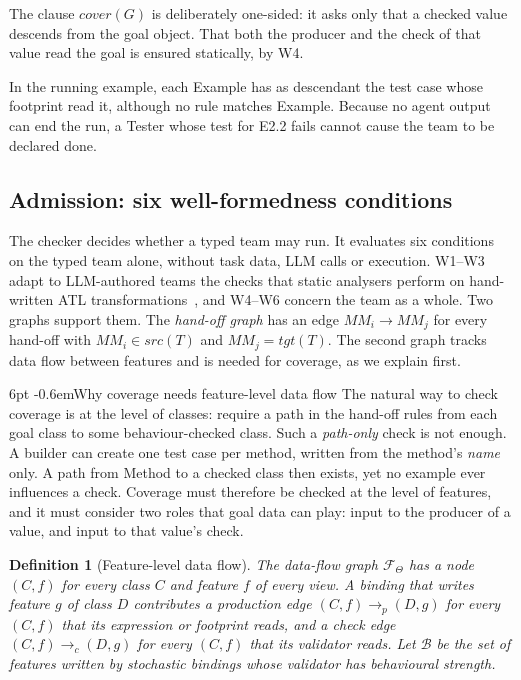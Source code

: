 \documentclass[pdflatex,sn-mathphys-num]{sn-jnl}
\makeatletter
\theoremstyle{thmstyleone}%
\theoremstyle{thmstyletwo}%
\theoremstyle{thmstylethree}%
\newtheorem{definition}{Definition}%
\newcommand{\Team}{\Theta}
\newcommand{\W}[1]{\textsf{W#1}}
\newcommand{\MM}{\mathit{MM}}
\newcommand{\cls}[1]{\textsf{#1}}
\renewcommand\paragraph{\@startsection{paragraph}{4}{\z@}%
  {6pt \@plus 2pt \@minus 1pt}{-0.6em}{\normalfont\normalsize\bfseries}}
\makeatother
\begin{document}
The clause $\mathit{cover}(G)$ is deliberately one-sided: it asks only that a
checked value descends from the goal object. That both the producer and the
check of that value read the goal is ensured statically, by \W{4}.

In the running example, each \cls{Example} has as descendant the test case
whose footprint read it, although no rule matches \cls{Example}. Because no
agent output can end the run, a Tester whose test for E2.2 fails cannot cause
the team to be declared done.

\subsection{Admission: six well-formedness conditions}\label{sec:app-check}

The checker decides whether a typed team may run. It evaluates six conditions
on the typed team alone, without task data, LLM calls or execution.
\W{1}--\W{3} adapt to LLM-authored teams the checks that static analysers
perform on hand-written ATL transformations~\cite{cuadrado2017static}, and
\W{4}--\W{6} concern the team as a whole. Two graphs support them. The
\emph{hand-off graph} has an edge $\MM_i\to\MM_j$ for every hand-off with
$\MM_i\in\mathit{src}(T)$ and $\MM_j=\mathit{tgt}(T)$. The second graph tracks
data flow between features and is needed for coverage, as we explain first.

\paragraph{Why coverage needs feature-level data flow} The natural way to check
coverage is at the level of classes: require a path in the hand-off rules from
each goal class to some behaviour-checked class. Such a \emph{path-only} check
is not enough. A builder can create one test case per method, written from the
method's \emph{name} only. A path from \cls{Method} to a checked class then
exists, yet no example ever influences a check. Coverage must therefore be
checked at the level of features, and it must consider two roles that goal
data can play: input to the producer of a value, and input to that value's
check.

\begin{definition}[Feature-level data flow]\label{def:dataflow}
The data-flow graph $\mathcal{F}_\Team$ has a node $(C,f)$ for every class $C$
and feature $f$ of every view. A binding that writes feature $g$ of class $D$
contributes a \emph{production} edge $(C,f)\to_p(D,g)$ for every $(C,f)$ that
its expression or footprint reads, and a \emph{check} edge $(C,f)\to_c(D,g)$
for every $(C,f)$ that its validator reads. Let $\mathcal{B}$ be the set of
features written by stochastic bindings whose validator has behavioural
strength.
\end{definition}
\end{document}
